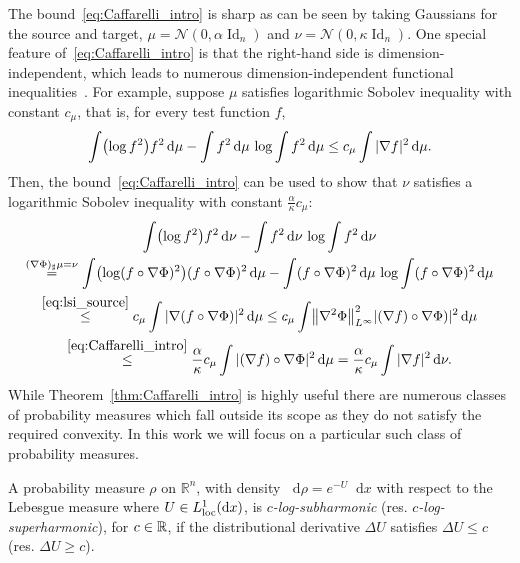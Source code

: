 \documentclass[AHL,Unicode,longabstracts]{cedram}
\newcommand{\R}{\mathbb R}
\DeclareMathOperator{\Id}{Id}
\DeclareMathOperator{\locc}{loc}
\newcommand{\dd}{n}
\newcommand{\conv}{c}
\newcommand{\prob}{\rho}
\newcommand{\source}{\mu}
\newcommand{\target}{\nu}
\newcommand{\lsh}{\alpha}
\newcommand{\lc}{\kappa}
\newcommand*\diff{\mathop{}\!\mathrm{d}}
\newcommand{\clN}{\mathcal{N}}
\newcommand{\OT}{\Phi}
\let\originalleft\left
\let\originalright\right
\renewcommand{\left}{\mathopen{}\mathclose\bgroup\originalleft}
\renewcommand{\right}{\aftergroup\egroup\originalright}
\let\oldin\in
\renewcommand{\in}{\mathchoice{\oldin}{\oldin}{\,\oldin\,}{\,\oldin\,}}
\begin{document}
The bound~\eqref{eq:Caffarelli_intro} is sharp as can be seen by taking Gaussians for the source and target, $\source=\clN(0,\lsh\Id_{\dd})$ and $\target=\clN(0,\lc\Id_{\dd})$. One special feature of~\eqref{eq:Caffarelli_intro} is that the right-hand side is dimension-independent, which leads to numerous dimension-independent functional inequalities~\cite{cordero2002some,cordero2004b,harge2004convex,klartag2007marginals}. For example, suppose $\source$ satisfies logarithmic Sobolev inequality with constant $c_{\source}$, that is, for every test function $f$,
\begin{equation}\label{eq:lsi_source}
\int \left(\log f^2\right)f^2\diff \source-\int f^2\diff \source\,\log\int f^2\diff \source\le c_{\source}\int |\nabla f|^2\diff \source.
\end{equation}
Then, the bound~\eqref{eq:Caffarelli_intro} can be used to show that $\target$ satisfies a logarithmic Sobolev inequality with constant $\frac{\lsh}{\lc}c_{\source}$:
\begin{multline}\label{eq:Lip-func_ineq}
\int \left(\log f^2\right)f^2\diff \target-\int f^2\diff \target\,\log\int f^2\diff \target\\
\overset{(\nabla \OT)_{\sharp}\source=\target}{=}\int \left(\log (f\circ \nabla\OT)^2\right)(f\circ \nabla \OT)^2\diff \source
-\int (f\circ \nabla\OT)^2\diff \source\,\log\int (f\circ\nabla \OT)^2\diff \source\\
\overset{\eqref{eq:lsi_source}}{\le} c_{\source}\int |\nabla (f\circ \nabla\OT)|^2\diff \source
\le c_{\source}\int \left\|\nabla^2\OT\right\|_{L^{\infty}}^2|(\nabla f)\circ \nabla\OT)|^2\diff \source\\
\overset{\eqref{eq:Caffarelli_intro}}{\le}\frac{\lsh}{\lc}c_{\source}\int |(\nabla f)\circ \nabla\OT|^2\diff \source=\frac{\lsh}{\lc}c_{\source}\int |\nabla f|^2\diff \target.
\end{multline}
While Theorem~\ref{thm:Caffarelli_intro} is highly useful there are numerous classes of probability measures which fall outside its scope as they do not satisfy the required convexity. In this work we will focus on a particular such class of probability measures.
\begin{defi}\label{def:log_subharmonic}
A probability measure $\prob$ on $\R^{\dd}$, with density $\diff \prob=e^{-U}\diff x$ with respect to the Lebesgue measure where $U\in L_{\locc}^1(\diff x)$, is \emph{$\conv$-log-subharmonic} (res. \emph{$\conv$-log-superharmonic}), for $\conv\in \R$, if the distributional derivative $\Delta U$ satisfies $\Delta U \le\conv $ (res. $\Delta U \ge \conv$).
\end{defi}
\end{document}
